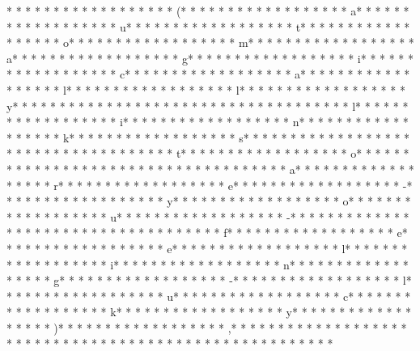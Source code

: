* * *  * * *  * * *  *  * * *  *  * * *  * (* * *  * * *  * * *  *  * * *  *  * * *  * a* * *  * * *  * * *  *  * * *  *  * * *  * u* * *  * * *  * * *  *  * * *  *  * * *  * t* * *  * * *  * * *  *  * * *  *  * * *  * o* * *  * * *  * * *  *  * * *  *  * * *  * m* * *  * * *  * * *  *  * * *  *  * * *  * a* * *  * * *  * * *  *  * * *  *  * * *  * g* * *  * * *  * * *  *  * * *  *  * * *  * i* * *  * * *  * * *  *  * * *  *  * * *  * c* * *  * * *  * * *  *  * * *  *  * * *  * a* * *  * * *  * * *  *  * * *  *  * * *  * l* * *  * * *  * * *  *  * * *  *  * * *  * l* * *  * * *  * * *  *  * * *  *  * * *  * y* * *  * * *  * * *  *  * * *  *  * * *  *  * * *  * * *  * * *  *  * * *  *  * * *  * l* * *  * * *  * * *  *  * * *  *  * * *  * i* * *  * * *  * * *  *  * * *  *  * * *  * n* * *  * * *  * * *  *  * * *  *  * * *  * k* * *  * * *  * * *  *  * * *  *  * * *  * s* * *  * * *  * * *  *  * * *  *  * * *  *  * * *  * * *  * * *  *  * * *  *  * * *  * t* * *  * * *  * * *  *  * * *  *  * * *  * o* * *  * * *  * * *  *  * * *  *  * * *  *  * * *  * * *  * * *  *  * * *  *  * * *  * a* * *  * * *  * * *  *  * * *  *  * * *  * r* * *  * * *  * * *  *  * * *  *  * * *  * e* * *  * * *  * * *  *  * * *  *  * * *  * -* * *  * * *  * * *  *  * * *  *  * * *  * y* * *  * * *  * * *  *  * * *  *  * * *  * o* * *  * * *  * * *  *  * * *  *  * * *  * u* * *  * * *  * * *  *  * * *  *  * * *  * -* * *  * * *  * * *  *  * * *  *  * * *  * 
* * *  * * *  * * *  *  * * *  *  * * *  * f* * *  * * *  * * *  *  * * *  *  * * *  * e* * *  * * *  * * *  *  * * *  *  * * *  * e* * *  * * *  * * *  *  * * *  *  * * *  * l* * *  * * *  * * *  *  * * *  *  * * *  * i* * *  * * *  * * *  *  * * *  *  * * *  * n* * *  * * *  * * *  *  * * *  *  * * *  * g* * *  * * *  * * *  *  * * *  *  * * *  * -* * *  * * *  * * *  *  * * *  *  * * *  * l* * *  * * *  * * *  *  * * *  *  * * *  * u* * *  * * *  * * *  *  * * *  *  * * *  * c* * *  * * *  * * *  *  * * *  *  * * *  * k* * *  * * *  * * *  *  * * *  *  * * *  * y* * *  * * *  * * *  *  * * *  *  * * *  * )* * *  * * *  * * *  *  * * *  *  * * *  * ,* * *  * * *  * * *  *  * * *  *  * * *  *  * * *  * * *  * * *  *  * * *  *  * * *  * 
* * *  * * *  * * *  *  * * *  *  * * *  * 
